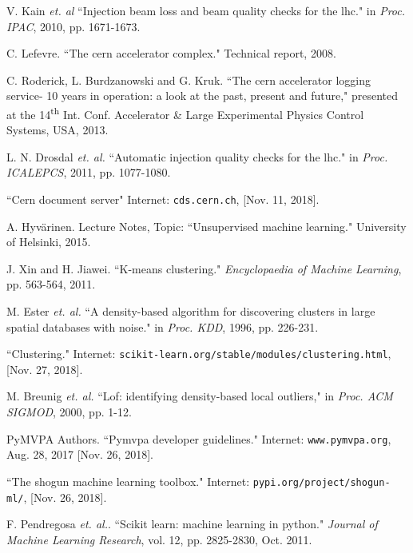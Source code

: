 \documentclass[12pt, twoside]{report}
\begin{document}
	\begin{thebibliography}{13}
		V. Kain \textit{et. al} ``Injection beam loss and beam quality checks for the lhc." in \textit{Proc. IPAC}, 2010, pp. 1671-1673.
		
		C. Lefevre. ``The cern accelerator complex." Technical report, 2008.
		
		C. Roderick, L. Burdzanowski and G. Kruk. ``The cern accelerator logging service- 10 years in operation: a look at the past, present and future," presented at the 14\textsuperscript{th} Int. Conf. Accelerator \& Large Experimental Physics Control Systems, USA, 2013.
		
		L. N. Drosdal \textit{et. al.} ``Automatic injection quality checks for the lhc." in \textit{Proc. ICALEPCS}, 2011, pp. 1077-1080.
		
		``Cern document server" Internet: \texttt{cds.cern.ch}, [Nov. 11, 2018].
		
		A. Hyv{\"a}rinen. Lecture Notes, Topic: ``Unsupervised machine learning." University of Helsinki, 2015.
		
		J. Xin and H. Jiawei. ``K-means clustering." \textit{Encyclopaedia of Machine Learning}, pp. 563-564, 2011.
		
		M. Ester \textit{et. al.} ``A density-based algorithm for discovering clusters in large spatial databases with noise." in \textit{Proc. KDD}, 1996, pp. 226-231.
		
		``Clustering." Internet: \texttt{scikit-learn.org/stable/modules/clustering.html}, [Nov. 27, 2018].
		
		M. Breunig \textit{et. al.} ``Lof: identifying density-based local outliers," in \textit{Proc. ACM SIGMOD}, 2000, pp. 1-12.
		
		PyMVPA Authors. ``Pymvpa developer guidelines." Internet: \texttt{www.pymvpa.org}, Aug. 28, 2017 [Nov. 26, 2018].
		
		``The shogun machine learning toolbox." Internet: \texttt{pypi.org/project/shogun-ml/}, [Nov. 26, 2018].
		
		F. Pendregosa \textit{et. al.}. ``Scikit learn: machine learning in python." \textit{Journal of Machine Learning Research}, vol. 12, pp. 2825-2830, Oct. 2011.
	\end{thebibliography}
\end{document}

